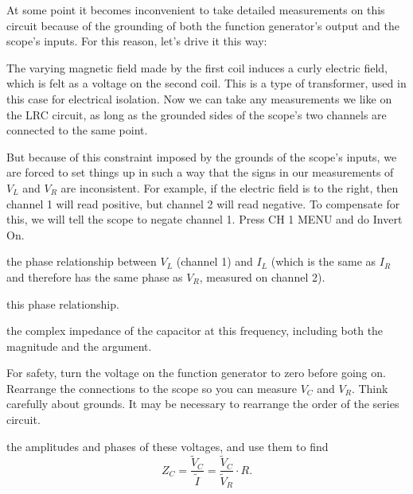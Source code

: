 At some point it becomes inconvenient to take detailed measurements on this circuit because of the grounding of
both the function generator's output and the scope's inputs. For this reason, let's drive it this way:


The varying magnetic field made by the first coil induces a curly electric field, which is felt as a voltage on the second
coil. This is a type of transformer, used in this case for electrical isolation. Now we can take any measurements we like
on the LRC circuit, as long as the grounded sides of the scope's two channels are connected to the same point.

But because of this constraint imposed by the grounds of the scope's inputs, we are forced to set things up in such
a way  that the signs in our measurements of $V_L$ and $V_R$ are inconsistent. For example, if the electric field is
to the right, then channel 1 will read positive, but channel 2 will read negative. To compensate for this, we will
tell the scope to negate channel 1. Press CH 1 MENU and do Invert On.

\obsnocolon the phase relationship between $V_L$ (channel 1) and $I_L$ (which is the same as $I_R$ and therefore has the
same phase as $V_R$, measured on channel 2).

\explain this phase relationship.

\pagebreak


\predictnocolon the complex impedance of the capacitor at this frequency, including both the magnitude and the argument.

For safety, turn the voltage on the function generator to zero before going on. Rearrange the connections to the scope
so you can measure $V_C$ and $V_R$. Think carefully about grounds. It may be necessary to rearrange the order of the
series circuit.

\newcommand{\mytilde}[1]{\widetilde{#1}}
\newcommand{\mytildewide}[1]{\stackrel{\sim}{\smash{#1}\rule{0pt}{1.1ex}}}


\measure the amplitudes and phases of these voltages, and use them to find
\begin{equation*}
  Z_C = \frac{\mytilde{V}_C}{\mytilde{I}} = \frac{\mytilde{V}_C}{\mytilde{V}_R} \cdot R.
\end{equation*}

